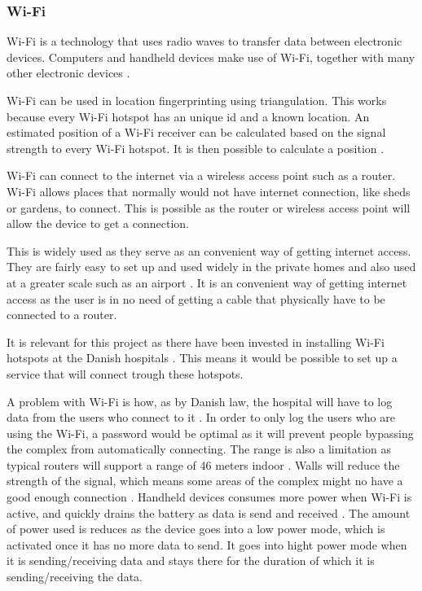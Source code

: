\subsubsection{Wi-Fi} \label{wifitech}
Wi-Fi is a technology that uses radio waves to transfer data between electronic devices. Computers and handheld devices make use of Wi-Fi, together with many other electronic devices \cite{wifi_devices}.

Wi-Fi can be used in location fingerprinting using triangulation. This works because every Wi-Fi hotspot has an unique id and a known location. An estimated position of a Wi-Fi receiver can be calculated based on the signal strength to every Wi-Fi hotspot. It is then possible to calculate a position  \cite{Liu2007}.

Wi-Fi can connect to the internet via a wireless access point such as a router. Wi-Fi allows places that normally would not have internet connection, like sheds or gardens, to connect. This is possible as the router or wireless access point will allow the device to get a connection.

This is widely used as they serve as an convenient way of getting internet access. They are fairly easy to set up and used widely in the private homes and also used at a greater scale such as an airport \cite{wifi_works}. It is an convenient way of getting internet access as the user is in no need of getting a cable that physically have to be connected to a router.

It is relevant for this project as there have been invested in installing Wi-Fi hotspots at the Danish hospitals \cite{wifi_hospi}. This means it would be possible to set up a service that will connect trough these hotspots.

A problem with Wi-Fi is how, as by Danish law, the hospital will have to log data from the users who connect to it \cite{wifi_log}. In order to only log the users who are using the Wi-Fi, a password would be optimal as it will prevent people bypassing the complex from automatically connecting. The range is also a limitation as typical routers will support a range of 46 meters indoor \cite{wifi_range}. Walls will reduce the strength of the signal, which means some areas of the complex might no have a good enough connection \cite{wifi_wall}. Handheld devices consumes more power when Wi-Fi is active, and quickly drains the battery as data is send and received \cite{wifi_batt}. The amount of power used is reduces as the device goes into a low power mode, which is activated once it has no more data to send. It goes into hight power mode when it is sending/receiving data and stays there for the duration of which it is sending/receiving the data.

